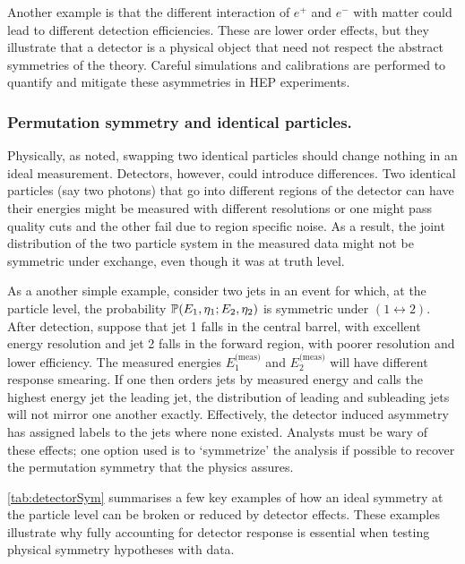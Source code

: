             Another example is that the different interaction of $e^+$ and $e^-$ with matter could lead to different detection efficiencies.
            These are lower order effects, but they illustrate that a detector is a physical object that need not respect the abstract symmetries of the theory.
            Careful simulations and calibrations are performed to quantify and mitigate these asymmetries in HEP experiments.

        \subsubsection{Permutation symmetry and identical particles.}

            Physically, as noted, swapping two identical particles should change nothing in an ideal measurement.
            Detectors, however, could introduce differences.
            Two identical particles (say two photons) that go into different regions of the detector can have their energies might be measured with different resolutions or one might pass quality cuts and the other fail due to region specific noise. 
            As a result, the joint distribution of the two particle system in the measured data might not be symmetric under exchange, even though it was at truth level.
            
            As a another simple example, consider two jets in an event for which, at the particle level, the probability $\P(E_1, \eta_1; E_2, \eta_2)$ is symmetric under $(1\leftrightarrow 2)$.
            After detection, suppose that jet 1 falls in the central barrel, with excellent energy resolution and jet 2 falls in the forward region, with poorer resolution and lower efficiency.
            The measured energies $E_1^\text{(meas)}$ and $E_2^\text{(meas)}$ will have different response smearing.
            If one then orders jets by measured energy and calls the highest energy jet the leading jet, the distribution of leading and subleading jets will not mirror one another exactly.
            Effectively, the detector induced asymmetry has assigned labels to the jets where none existed.
            Analysts must be wary of these effects;
            one option used is to `symmetrize' the analysis if possible to recover the permutation symmetry that the physics assures.

        \cref{tab:detectorSym} summarises a few key examples of how an ideal symmetry at the particle level can be broken or reduced by detector effects.
        These examples illustrate why fully accounting for detector response is essential when testing physical symmetry hypotheses with data.

